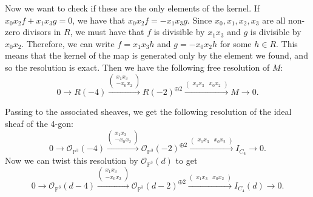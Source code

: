 Now we want to check if these are the only elements of the kernel. If $x_0x_2f + x_1x_3g = 0$, we have that $x_0x_2f = -x_1x_3g$. Since $x_0, x_1, x_2, x_3$ are all non-zero divisors in $R$, we must have that $f$ is divisible by $x_1x_3$ and $g$ is divisible by $x_0x_2$. Therefore, we can write $f = x_1x_3h$ and $g = -x_0x_2h$ for some $h \in R$. This means that the kernel of the map is generated only by the element we found, and so the resolution is exact. Then we have the following free resolution of $M$:
\[0 \to R(-4) \xrightarrow{\begin{pmatrix}
    x_1x_3 \\
    -x_0x_2
\end{pmatrix}} R(-2)^{\oplus 2} \xrightarrow{\begin{pmatrix}
    x_1x_3 & x_0x_2
\end{pmatrix}} M \to 0.\]

Passing to the associated sheaves, we get the following resolution of the ideal sheaf of the 4-gon:
\[0 \to \mathcal{O}_{\mathbb{P}^3}(-4) \xrightarrow{\begin{pmatrix}
    x_1x_3 \\
    -x_0x_2
\end{pmatrix}} \mathcal{O}_{\mathbb{P}^3}(-2)^{\oplus 2} \xrightarrow{\begin{pmatrix}
    x_1x_3 & x_0x_2
\end{pmatrix}} I_{C_4} \to 0.\]
Now we can twist this resolution by $\mathcal{O}_{\mathbb{P}^3}(d)$ to get
\begin{equation}\label{eq:resol}
    0 \to \mathcal{O}_{\mathbb{P}^3}(d-4) \xrightarrow{\begin{pmatrix}
    x_1x_3 \\
    -x_0x_2
\end{pmatrix}} \mathcal{O}_{\mathbb{P}^3}(d-2)^{\oplus 2} \xrightarrow{\begin{pmatrix}
    x_1x_3 & x_0x_2
\end{pmatrix}} I_{C_4}(d) \to 0.
\end{equation}



